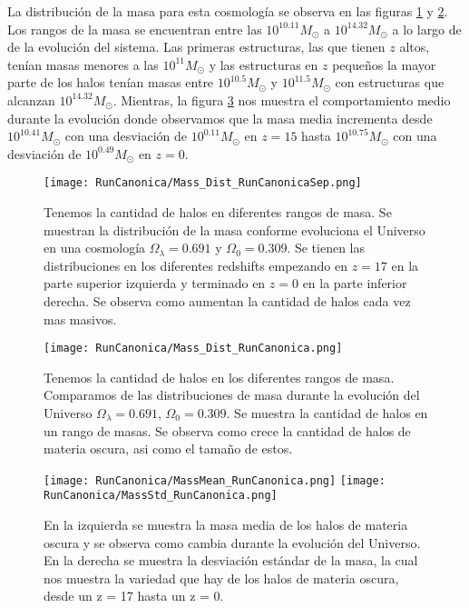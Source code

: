 La distribución de la masa para esta cosmología se observa en las figuras \ref{fig:Canon-MassDistSep} y \ref{fig:Canon-MassDist}. Los rangos de la masa se encuentran entre las $10^{10.11}M_\odot$ a $10^{14.32}M_\odot$ a lo largo de de la evolución del sistema. Las primeras estructuras, las que tienen $z$ altos, tenían masas menores a las $10^{11}M_\odot$ y las estructuras en $z$ pequeños la mayor parte de los halos tenían masas entre $10^{10.5}M_\odot$ y $10^{11.5}M_\odot$ con estructuras que alcanzan $10^{14.32}M_\odot$. Mientras, la figura \ref{fig:Canon-MassStats} nos muestra el comportamiento medio durante la evolución donde observamos que la masa media incrementa desde $10^{10.41}M_\odot$ con una desviación de $10^{0.11}M_\odot$ en $z=15$ hasta $10^{10.75}M_\odot$ con una desviación de $10^{0.49}M_\odot$ en $z=0$.

\begin{figure}[H]
    \centering
    \texttt{[image: RunCanonica/Mass\_Dist\_RunCanonicaSep.png]}
    \caption[Distribución de masa]{\footnotesize Tenemos la cantidad de halos en diferentes rangos de masa. Se muestran la distribución de la masa conforme evoluciona el Universo en una cosmología $\Omega_\lambda = 0.691 $ y $\Omega_0 = 0.309$. Se tienen las distribuciones en los diferentes redshifts empezando en $z=17$ en la parte superior izquierda y terminado en $z=0$ en la parte inferior derecha. Se observa como aumentan la cantidad de halos cada vez mas masivos.}
    \label{fig:Canon-MassDistSep}
\end{figure}

\begin{figure}[H]
    \centering
    \texttt{[image: RunCanonica/Mass\_Dist\_RunCanonica.png]}
    \caption[Comparación de distribución de masa]{\footnotesize Tenemos la cantidad de halos en los diferentes rangos de masa. Comparamos de las distribuciones de masa durante la evolución del Universo $\Omega_\lambda = 0.691 $, $\Omega_0 = 0.309$. Se muestra la cantidad de halos en un rango de masas. Se observa como crece la cantidad de halos de materia oscura, asi como el tamaño de estos.}
    \label{fig:Canon-MassDist}
\end{figure}

\begin{figure}[H]
    \centering
    \texttt{[image: RunCanonica/MassMean\_RunCanonica.png]}
    \texttt{[image: RunCanonica/MassStd\_RunCanonica.png]}
    \caption[Media y desviación estándar de la distribución de masa]{\footnotesize En la izquierda se muestra la masa media de los halos de materia oscura y se observa como cambia durante la evolución del Universo. En la derecha se muestra la desviación estándar de la masa, la cual nos muestra la variedad que hay de los halos de materia oscura, desde un z = 17 hasta un z = 0.}
    \label{fig:Canon-MassStats}
\end{figure}

